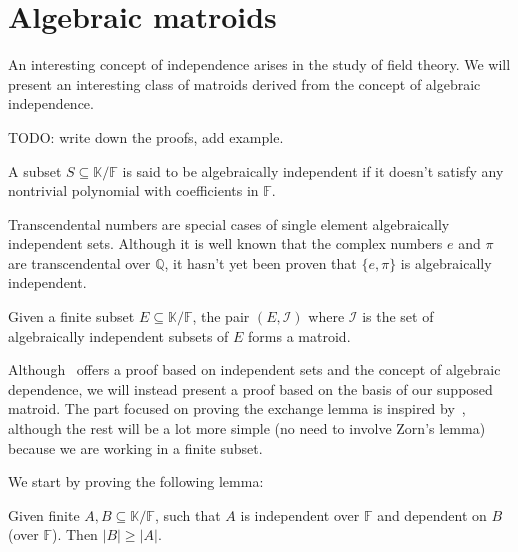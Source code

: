 \section{Algebraic matroids}

An interesting concept of independence arises in the study of field theory. We will present an interesting class of matroids derived from the concept of algebraic independence. 

TODO: write down the proofs, add example.

\begin{defn}
    A subset $S \subseteq \mathbb K / \mathbb F$ is said to be algebraically independent if it doesn't satisfy any nontrivial polynomial with coefficients in $\mathbb F$.
\end{defn}

Transcendental numbers are special cases of single element algebraically independent sets. Although it is well known that the complex numbers $e$ and $\pi$ are transcendental over $\mathbb{Q} $, it hasn't yet been proven that $\{e, \pi \}$ is algebraically independent.

\begin{theorem}
    Given a finite subset $E \subseteq \mathbb K / \mathbb F$, the pair $(E, \mathcal I)$  where $\mathcal I$ is the set of algebraically independent subsets of $E$ forms a matroid.
\end{theorem}

    Although~\cite{oxley1} offers a proof based on independent sets and the concept of algebraic dependence, we will instead present a proof based on the basis of our supposed matroid. The part focused on proving the exchange lemma is inspired by~\cite{milne2022}, although the rest will be a lot more simple (no need to involve Zorn's lemma) because we are working in a finite subset.


  We start by proving the following lemma:
  \begin{lemma}\label{lem:algebraic-indep-smaller-than-dep}
    Given finite $A, B \subseteq \mathbb K / \mathbb F$, such that $A$ is independent over $\mathbb F$ and dependent on $B$ (over $\mathbb F$). Then $|B| \geq |A|$.
  \end{lemma}

